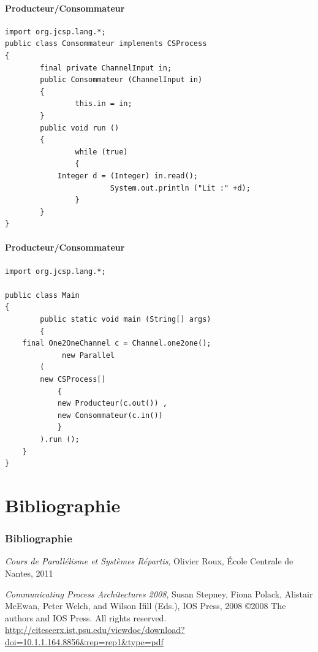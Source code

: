 \documentclass[slidetop,11pt]{beamer}
\begin{document}
\begin{frame}[containsverbatim]
\framesubtitle{Producteur/Consommateur}
\begin{lstlisting}[frame=trBL,title={Producteurs-Consommateurs: Consommateur.java}]
import org.jcsp.lang.*;
public class Consommateur implements CSProcess
{
        final private ChannelInput in;
        public Consommateur (ChannelInput in)
        {
                this.in = in;
        }
        public void run ()
        {
                while (true)
                {
			Integer d = (Integer) in.read();
                        System.out.println ("Lit :" +d);
                }
        }
}
\end{lstlisting}
\end{frame}

\begin{frame}[containsverbatim]
\framesubtitle{Producteur/Consommateur}
\begin{lstlisting}[frame=trBL,title={Producteurs-Consommateurs: Main.java}]
import org.jcsp.lang.*;

public class Main
{
        public static void main (String[] args)
        {
	final One2OneChannel c = Channel.one2one();
             new Parallel
		(
		new CSProcess[]
			{
			new Producteur(c.out()) ,
			new Consommateur(c.in())
			} 
		).run ();
	}
}
\end{lstlisting}
\end{frame}



\section{Bibliographie}

\begin{frame} 
\frametitle{Bibliographie}

\begin{thebibliography}{Cpa2008}
 {\textit{Cours de Parallélisme et Systèmes Répartis}, Olivier Roux, \'Ecole Centrale de Nantes, 2011}

 {\textit{Communicating Process Architectures 2008}, Susan Stepney, Fiona Polack, Alistair McEwan, Peter Welch, and Wilson Ifill (Eds.), IOS Press, 2008
\copyright 2008 The authors and IOS Press. All rights reserved.\\
\url{http://citeseerx.ist.psu.edu/viewdoc/download?doi=10.1.1.164.8856&rep=rep1&type=pdf}}
\end{thebibliography}
\end{frame}
\end{document}
